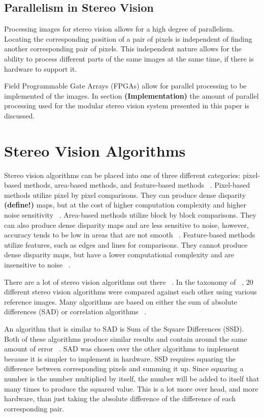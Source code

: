 \subsection{Parallelism in Stereo Vision}

Processing images for stereo vision allows for a high degree of parallelism. Locating the corresponding position of a pair of pixels is independent of finding another corresponding pair of pixels. This independent nature allows for the ability to process different parts of the same images at the same time, if there is hardware to support it.

Field Programmable Gate Arrays (FPGAs) allow for parallel processing to be implemented of the images. In section \textbf{(Implementation)} the amount of parallel processing used for the modular stereo vision system presented in this paper is discussed. 

\section{Stereo Vision Algorithms}

Stereo vision algorithms can be placed into one of three different categories: pixel-based methods, area-based methods, and feature-based methods ~\cite{similarAlgorithms}. Pixel-based methods utilize pixel by pixel comparisons. They can produce dense disparity \textbf{(define!)} maps, but at the cost of higher computation complexity and higher noise sensitivity ~\cite{similarAlgorithms}. Area-based methods utilize block by block comparisons. They can also produce dense disparity maps and are less sensitive to noise, however, accuracy tends to be low in areas that are not smooth ~\cite{similarAlgorithms}. Feature-based methods utilize features, such as edges and lines for comparisons. They cannot produce dense disparity maps, but have a lower computational complexity and are insensitive to noise ~\cite{similarAlgorithms}. 

There are a lot of stereo vision algorithms out there ~\cite{taxonomy}. In the taxonomy of ~\cite{taxonomy}, 20 different stereo vision algorithms were compared against each other using various reference images. Many algorithms are based on either the sum of absolute differences (SAD) or correlation algorithms ~\cite{alteraStratixIVPaper}.

An algorithm that is similar to SAD is Sum of the Square Differences (SSD). Both of these algorithms produce similar results and contain around the same amount of error ~\cite{similarAlgorithms}. SAD was chosen over the other algorithms to implement because it is simpler to implement in hardware. SSD requires squaring the difference between corresponding pixels and summing it up. Since squaring a number is the number multiplied by itself, the number will be added to itself that many times to produce the squared value. This is a lot more over head, and more hardware, than just taking the absolute difference of the difference of each corresponding pair.

